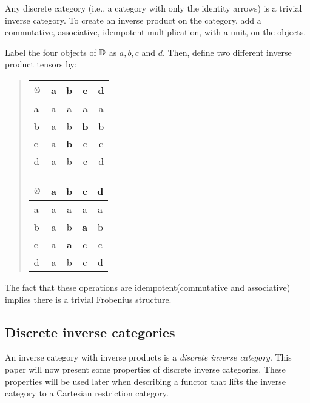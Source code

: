 \begin{example}
  \label{example:invprodisstructure}
\end{example}
Any discrete category (i.e., a category with only the identity arrows) is a trivial inverse
category. To create an inverse product on the category, add a commutative, associative, idempotent
multiplication, with a unit, on the objects.

Label the four objects of $\mathbb{D}$ as $a,b,c$ and $d$. Then, define two different inverse product
tensors by:
\begin{quote}
  \qquad\qquad
  \begin{tabular}{|l||c|c|c|c|}
    \hline
    $\otimes$&a&b&c&d\\ \hline \hline
    a&a&a&a&a\\ \hline
    b&a&b&\textbf{b}&b\\ \hline
    c&a&\textbf{b}&c&c \\ \hline
    d&a&b&c&d \\ \hline
  \end{tabular}
  \hfil
  \begin{tabular}{|l||c|c|c|c|}
    \hline
    $\otimes$&a&b&c&d\\ \hline \hline
    a&a&a&a&a\\ \hline
    b&a&b&\textbf{a}&b\\ \hline
    c&a&\textbf{a}&c&c \\ \hline
    d&a&b&c&d \\ \hline
  \end{tabular}
  \qquad \qquad
\end{quote}

The fact that these operations are idempotent(commutative and associative) implies there is a
trivial Frobenius structure.



\subsection{Discrete inverse categories} %
\label{sub:discrete_inverse_categories}


An inverse category with inverse products is a \emph{discrete inverse category}. This paper will
now present some properties of discrete inverse categories. These properties will be used later
when describing a functor that lifts the inverse category to a Cartesian restriction category.


